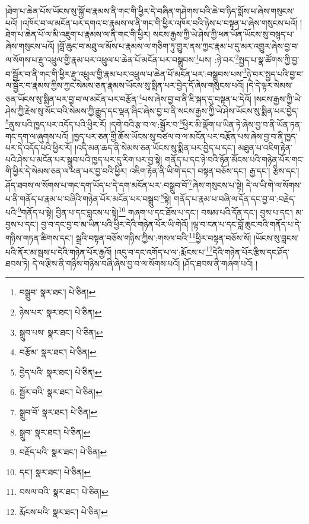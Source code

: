 །ཐེག་པ་ཆེན་པོས་ཡོངས་སུ་སྐྱོ་བ་རྣམས་ནི་གང་གི་ཕྱིར་དེ་བཞིན་གཤེགས་པའི་ཆེ་བ་ཉིད་སྨོས་པ་ཞེས་གསུངས་པའོ། །འཁོར་བ་ལ་མངོན་པར་དགའ་བ་རྣམས་ལ་ནི་གང་གི་ཕྱིར་འཁོར་བའི་ཉེས་པ་བསྟན་པ་ཞེས་གསུངས་པའོ། །ཐེག་པ་ཆེན་པོ་ལ་མི་འཇུག་པ་རྣམས་ལ་ནི་གང་གི་ཕྱིར། སངས་རྒྱས་ཀྱི་ཡེ་ཤེས་ཀྱི་ཕན་ཡོན་ཡོངས་སུ་བསྙད་པ་ཞེས་གསུངས་པའོ། །བློ་ཆུང་བ་མཐུ་ལ་མོས་པ་རྣམས་ལ་གཅིག་ཏུ་གྱུར་ནས་ཀྱང་རྣམ་པ་དུ་མར་འགྱུར་ཞེས་བྱ་བ་ལ་སོགས་པ་རྫུ་འཕྲུལ་གྱི་རྣམ་པར་འཕྲུལ་པ་ཆེན་པོ་མངོན་པར་བསྒྲུབས་\footnote{བསྒྲུབ་  སྣར་ཐང་།  པེ་ཅིན། }པས། :ཉེ་བར་\footnote{ཉེས་པར་  སྣར་ཐང་།  པེ་ཅིན། }སྤྱད་པ་སྣ་ཚོགས་ཀྱི་བྱ་བ་སྦྱོར་བ་ནི་གང་གི་ཕྱིར་རྫུ་འཕྲུལ་གྱི་རྣམ་པར་འཕྲུལ་པ་ཆེན་པོ་མངོན་པར་:བསྒྲུབས་པས་\footnote{སྒྲུབ་པས་  སྣར་ཐང་།  པེ་ཅིན། }ཉེ་བར་སྤྱད་པའི་བྱ་བ་ལ་སྦྱོར་བ་རྣམས་ཀྱིས་ཀྱང་སེམས་ཅན་རྣམས་ཡོངས་སུ་སྨིན་པར་བྱེད་དོ་ཞེས་གསུངས་པའོ། །དེ་དེ་ལྟར་སེམས་ཅན་ཡོངས་སུ་སྨིན་པར་བྱ་བ་ལ་མངོན་པར་བརྩོན་\footnote{བརྩོམ་  སྣར་ཐང་།  པེ་ཅིན། }པས་ཞེས་བྱ་བ་ནི་ཇི་སྐད་དུ་བསྟན་པ་དེའོ། །སངས་རྒྱས་ཀྱི་ཡེ་ཤེས་ཀྱི་རྗེས་སུ་སོང་བའི་སེམས་ཀྱི་རྒྱུད་དང་ལྡན་ཞིང་ཞེས་བྱ་བ་ནི་སངས་རྒྱས་ཀྱི་ཡེ་ཤེས་ཡོངས་སུ་སྨིན་པར་བྱེད་\footnote{བྱེད་པའི་  སྣར་ཐང་།  པེ་ཅིན། }ནུས་པའི་ཁྱད་པར་འདོད་པའི་ཕྱིར་རོ། །དགེ་བའི་རྩ་བ་ལ་:སྦྱོར་བ་\footnote{སྦྱོར་བའི་  སྣར་ཐང་།  པེ་ཅིན། }ཕྱིར་མི་ལྡོག་པ་ཡིན་ཏེ་ཞེས་བྱ་བ་ནི་ཡོན་ཏན་གང་དག་ལ་ཞུགས་པའོ། །ཁྱད་པར་ཅན་གྱི་ཆོས་ཡོངས་སུ་བཙལ་བ་ལ་མངོན་པར་བརྩོན་པས་ཞེས་བྱ་བ་ནི་ཁྱད་པར་དེ་འདོད་པའི་ཕྱིར་རོ། །འདི་མན་ཆད་ནི་སེམས་ཅན་ཡོངས་སུ་སྨིན་པར་བྱེད་པ་དང་། མཐུན་པ་འཇིག་རྟེན་པའི་ཤེས་པ་མངོན་པར་སྒྲུབ་པའི་ཁྱད་པར་དུ་རིག་པར་བྱ་སྟེ། གནོད་པ་དང་ཉེ་བའི་ཉོན་མོངས་པའི་གཉེན་པོར་གང་གི་ཕྱིར་དེ་སེམས་ཅན་ལ་ཕན་པར་བྱ་བའི་ཕྱིར། འཇིག་རྟེན་ནི་ཡི་གེ་དང་། བསྟན་བཅོས་དང་། རྒྱ་དང་། རྩིས་དང་། ཤོད་ཐབས་ལ་སོགས་པ་གང་དག་ཡོད་པ་དེ་དག་མངོན་པར་:བསྒྲུབ་བོ་\footnote{སྒྲུབ་བོ་  སྣར་ཐང་།  པེ་ཅིན། }ཞེས་གསུངས་པ་སྟེ། དེ་ལ་ཡི་གེ་ལ་སོགས་པ་ནི་གནོད་པ་རྣམ་པ་བཞིའི་གཉེན་པོར་མངོན་པར་བསྒྲུབ་\footnote{སྒྲུབ་  སྣར་ཐང་།  པེ་ཅིན། }སྟེ། གནོད་པ་རྣམ་པ་བཞི་ལ་དོན་དང་བྱ་བ་:བརྗེད་པའི་\footnote{བརྗོད་པའི་  སྣར་ཐང་།  པེ་ཅིན། }གནོད་པ་སྟེ། བྱིན་པ་དང་བླངས་པ་སྟེ།\footnote{དང་།  སྣར་ཐང་།  པེ་ཅིན། } གཞག་པ་དང་ཐོས་པ་དང་། བསམ་པའི་དོན་དང་། བྱས་པ་དང་། མ་བྱས་པ་དང་། བྱ་བ་དང་བྱ་བ་མ་ཡིན་པའི་ཕྱིར་དེའི་གཉེན་པོར་ཡི་གེའོ། །ལྟ་བ་ངན་པ་དང་བློ་ཆུང་བའི་གནོད་པ་དེ་གཉིས་གཏན་ཚིགས་དང་། སྒྲའི་བསྟན་བཅོས་གཉིས་ཀྱིས་:གསལ་བའི་\footnote{བསལ་བའི་  སྣར་ཐང་།  པེ་ཅིན། }ཕྱིར་བསྟན་བཅོས་སོ། །ཡོངས་སུ་བླངས་པའི་ནོར་མ་སྦས་པ་དེའི་གཉེན་པོར་རྒྱའོ། །འདུ་བ་དང་འགོད་པ་ལ་:རྨོངས་པ་\footnote{རྨོངས་པའི་  སྣར་ཐང་།  པེ་ཅིན། }དེའི་གཉེན་པོར་རྩིས་དང་ཤོད་ཐབས་ཏེ། དེ་ལ་རྩིས་ནི་གཉིས་གཉིས་བཞི་ཞེས་བྱ་བ་ལ་སོགས་པའོ། །ཤོད་ཐབས་ནི་གཞག་པའོ། །
